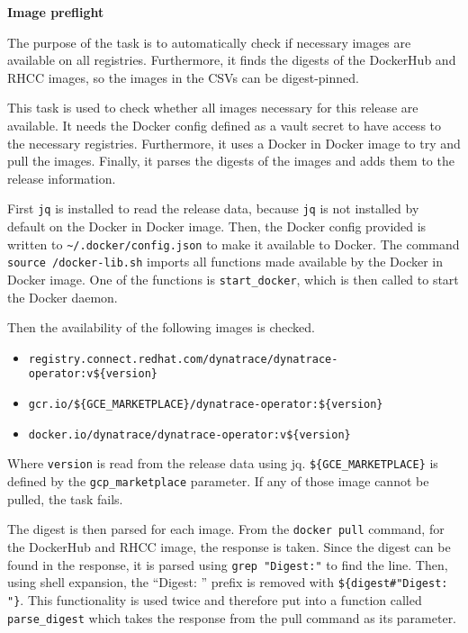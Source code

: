 \textbf{Image preflight}

The purpose of the task is to automatically check if necessary images are available on all registries.
Furthermore, it finds the digests of the DockerHub and RHCC images, so the images in the CSVs can be digest-pinned.

This task is used to check whether all images necessary for this release are available.
It needs the Docker config defined as a vault secret to have access to the necessary registries.
Furthermore, it uses a Docker in Docker image to try and pull the images.
Finally, it parses the digests of the images and adds them to the release information.

First \verb|jq| is installed to read the release data, because \verb|jq| is not installed by default on the Docker in Docker image.
Then, the Docker config provided is written to \verb|~/.docker/config.json| to make it available to Docker.
The command \verb|source /docker-lib.sh| imports all functions made available by the Docker in Docker image.
One of the functions is \verb|start_docker|, which is then called to start the Docker daemon.

Then the availability of the following images is checked.
\begin{itemize}
    \item \verb|registry.connect.redhat.com/dynatrace/dynatrace-operator:v${version}|
    \item \verb|gcr.io/${GCE_MARKETPLACE}/dynatrace-operator:${version}|
    \item \verb|docker.io/dynatrace/dynatrace-operator:v${version}|
\end{itemize}

Where \verb|version| is read from the release data using jq.
\verb|${GCE_MARKETPLACE}| is defined by the \verb|gcp_marketplace| parameter.
If any of those image cannot be pulled, the task fails.

The digest is then parsed for each image.
From the \verb|docker pull| command, for the DockerHub and RHCC image, the response is taken.
Since the digest can be found in the response, it is parsed using \verb|grep "Digest:"| to find the line.
Then, using shell expansion, the ``Digest: '' prefix is removed with \verb|${digest#"Digest: "}|.
This functionality is used twice and therefore put into a function called \verb|parse_digest| which takes the response from the pull command as its parameter.
